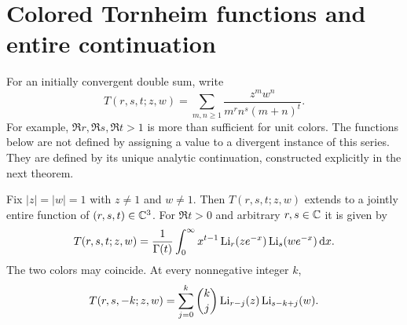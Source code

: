 \section{Colored Tornheim functions and entire continuation}\label{tsc:tornheim}
For an initially convergent double sum, write
\begin{equation}\label{tsc:Tdef}
 T(r,s,t;z,w)=\sum_{m,n\ge1}
           \frac{z^m w^n}{m^r n^s(m+n)^t}.
\end{equation}
For example, $\Re r,\Re s,\Re t>1$ is more than sufficient for unit
colors. The functions below are not defined by assigning a value to a
divergent instance of this series. They are defined by its unique analytic
continuation, constructed explicitly in the next theorem.

\begin{theorem}\label{tsc:T-entire}
Fix $|z|=|w|=1$ with $z\ne1$ and $w\ne1$. Then
$T(r,s,t;z,w)$ extends to a jointly entire function of $(r,s,t)\in\mathbb C^3$.
For $\Re t>0$ and arbitrary $r,s\in\mathbb C$ it is given by
\begin{equation}\label{tsc:T-mellin}
 T(r,s,t;z,w)=\frac1{\Gamma(t)}
   \int_0^\infty x^{t-1}\operatorname{Li}_r(ze^{-x})\operatorname{Li}_s(we^{-x})\,\mathrm d x.
\end{equation}
The two colors may coincide. At every nonnegative integer $k$,
\begin{equation}\label{tsc:T-negative}
 T(r,s,-k;z,w)=\sum_{j=0}^k\binom{k}{j}
                \operatorname{Li}_{r-j}(z)\operatorname{Li}_{s-k+j}(w).
\end{equation}
\end{theorem}
